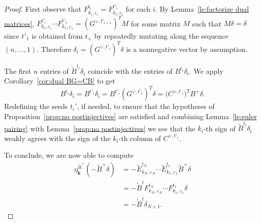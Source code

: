 \documentclass{amsart}
\numberwithin{theorem}{section}
\newcommand{\bfk}{{\boldsymbol{k}}}
\begin{document}
  \begin{proof}
    First observe that $F^{t_i}_{k_i,\varepsilon_i}=F^{t'_i}_{k_i,\varepsilon_i}$ for each $i$.
    By Lemma~\ref{le:factorize dual matrices}, $F^{t'_i}_{k_i,\varepsilon_i} \cdots F^{t'_1}_{k_1,\varepsilon_1}=(G^{\vee,t'_{i+1}})^T M$ for some matrix $M$ such that $M\delta=\delta$ since $t'_1$ is obtained from $t_+$ by repeatedly mutating along the sequence $(n,\ldots,1)$.
    Therefore $\delta_i = (G^{\vee,t'_i})^T \delta$ is a nonnegative vector by assumption.
    
    The first $n$ entries of $\widetilde B^{t_i} \delta_i$ coincide with the entries of $B^{t_i} \delta_i$.
    We apply Corollary~\ref{cor:dual BG=CB} to get
    \[
      B^{t_i} \delta_i 
      = B^{t'_i} \delta_i 
      = B^{t'_i} (G^{\vee,t'_i})^T \delta
      = \big(C^{\vee,t'_i}\big)^T B^+ \delta.
    \]
    Redefining the seeds $t_i'$, if needed, to ensure that the hypotheses of Proposition~\ref{prop:no postinjectives} are satisfied and combining Lemma~\ref{le:euler pairing} with Lemma~\ref{prop:no postinjectives} we see that the $k_i$-th sign of $\widetilde B^{t_i} \delta_i$ weakly agrees with the sign of the $k_i$-th column of $C^{\vee,t'_i}$.

    To conclude, we are now able to compute 
    \begin{align*}
      \eta_\bfk^{\widetilde B^+}\left(-\widetilde B^+\delta\right)
      &= - \widetilde E^{t_N}_{k_N,\varepsilon_N} \cdots \widetilde E^{t_1}_{k_1,\varepsilon_1} \widetilde B^+ \delta\\
      &= - \widetilde B^t F^{t_N}_{k_N,\varepsilon_N} \cdots F^{t_1}_{k_1,\varepsilon_1} \delta\\
      &= - \widetilde B^t \delta_{N+1}.
    \end{align*}
  \end{proof}
\end{document}

